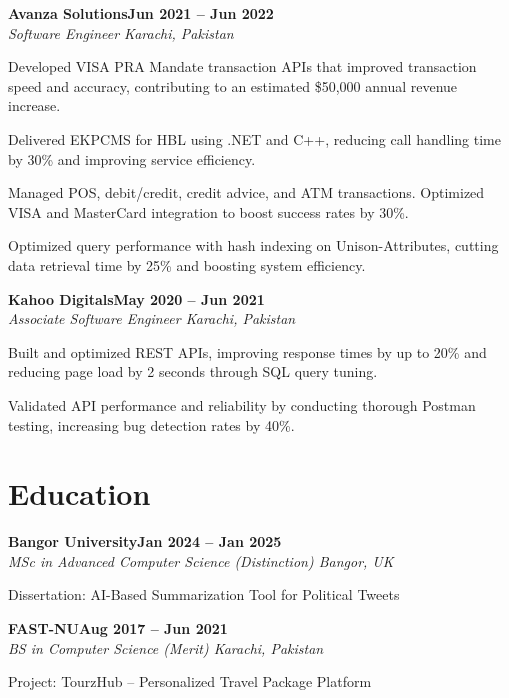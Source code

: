 \documentclass[letterpaper,10pt]{article}
\newcommand{\headingBf}[2]{
  \hspace{10pt}\textbf{#1}\hfill\textbf{#2}\\
}
\newcommand{\headingIt}[2]{
  \hspace{10pt}\textit{#1}\hfill\textit{#2}\\
}
\newenvironment{resume_list}{
  \vspace{-7pt}
  \begin{itemize}[itemsep=-2px, parsep=1pt, leftmargin=30pt]
}{
  \end{itemize}
}
\begin{document}
\headingBf{Avanza Solutions}{Jun 2021 -- Jun 2022}
\headingIt{Software Engineer \hfill Karachi, Pakistan}{}
\begin{resume_list}
    \item Developed VISA PRA Mandate transaction APIs that improved transaction speed and accuracy, contributing to an estimated \$50,000 annual revenue increase.
    \item Delivered EKPCMS for HBL using .NET and C++, reducing call handling time by 30\% and improving service efficiency.
    \item Managed POS, debit/credit, credit advice, and ATM transactions. Optimized VISA and MasterCard integration to boost success rates by 30\%.
    \item Optimized query performance with hash indexing on Unison-Attributes, cutting data retrieval time by 25\% and boosting system efficiency.
\end{resume_list}

\headingBf{Kahoo Digitals}{May 2020 -- Jun 2021}
\headingIt{Associate Software Engineer \hfill Karachi, Pakistan}{}
\begin{resume_list}
    \item Built and optimized REST APIs, improving response times by up to 20\% and reducing page load by 2 seconds through SQL query tuning.
    \item Validated API performance and reliability by conducting thorough Postman testing, increasing bug detection rates by 40\%.
\end{resume_list}

\section{Education}

\headingBf{Bangor University}{Jan 2024 -- Jan 2025}
\headingIt{MSc in Advanced Computer Science (Distinction) \hfill Bangor, UK}{}
\begin{resume_list}
    \item Dissertation: AI-Based Summarization Tool for Political Tweets
\end{resume_list}

\headingBf{FAST-NU}{Aug 2017 -- Jun 2021}
\headingIt{BS in Computer Science (Merit) \hfill Karachi, Pakistan}{}
\begin{resume_list}
    \item Project: TourzHub -- Personalized Travel Package Platform
\end{resume_list}
\end{document}
